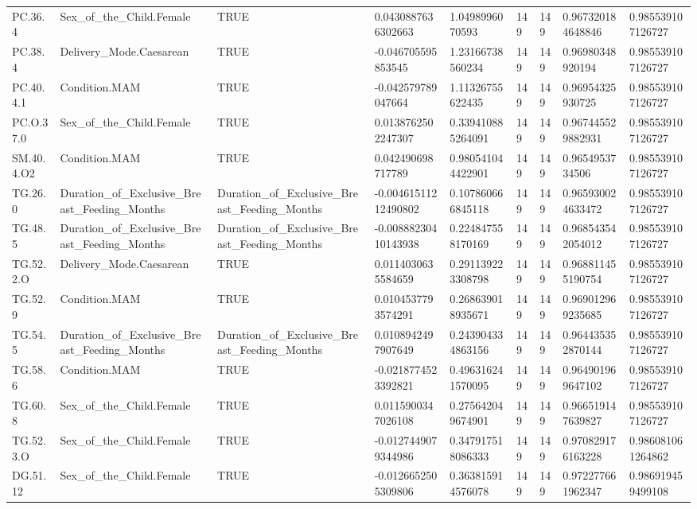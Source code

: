 \begin{longtable}{lllllllll}
PC.36.4 & Sex\_of\_the\_Child.Female & TRUE & 0.0430887636302663 & 1.0498996070593 & 149 & 149 & 0.967320184648846 & 0.985539107126727 \\
PC.38.4 & Delivery\_Mode.Caesarean & TRUE & -0.046705595853545 & 1.23166738560234 & 149 & 149 & 0.96980348920194 & 0.985539107126727 \\
PC.40.4.1 & Condition.MAM & TRUE & -0.042579789047664 & 1.11326755622435 & 149 & 149 & 0.96954325930725 & 0.985539107126727 \\
PC.O.37.0 & Sex\_of\_the\_Child.Female & TRUE & 0.0138762502247307 & 0.339410885264091 & 149 & 149 & 0.967445529882931 & 0.985539107126727 \\
SM.40.4.O2 & Condition.MAM & TRUE & 0.042490698717789 & 0.980541044422901 & 149 & 149 & 0.9654953734506 & 0.985539107126727 \\
TG.26.0 & Duration\_of\_Exclusive\_Breast\_Feeding\_Months & Duration\_of\_Exclusive\_Breast\_Feeding\_Months & -0.00461511212490802 & 0.107860666845118 & 149 & 149 & 0.965930024633472 & 0.985539107126727 \\
TG.48.5 & Duration\_of\_Exclusive\_Breast\_Feeding\_Months & Duration\_of\_Exclusive\_Breast\_Feeding\_Months & -0.00888230410143938 & 0.224847558170169 & 149 & 149 & 0.968543542054012 & 0.985539107126727 \\
TG.52.2.O & Delivery\_Mode.Caesarean & TRUE & 0.0114030635584659 & 0.291139223308798 & 149 & 149 & 0.968811455190754 & 0.985539107126727 \\
TG.52.9 & Condition.MAM & TRUE & 0.0104537793574291 & 0.268639018935671 & 149 & 149 & 0.969012969235685 & 0.985539107126727 \\
TG.54.5 & Duration\_of\_Exclusive\_Breast\_Feeding\_Months & Duration\_of\_Exclusive\_Breast\_Feeding\_Months & 0.0108942497907649 & 0.243904334863156 & 149 & 149 & 0.964435352870144 & 0.985539107126727 \\
TG.58.6 & Condition.MAM & TRUE & -0.0218774523392821 & 0.496316241570095 & 149 & 149 & 0.964901969647102 & 0.985539107126727 \\
TG.60.8 & Sex\_of\_the\_Child.Female & TRUE & 0.0115900347026108 & 0.275642049674901 & 149 & 149 & 0.966519147639827 & 0.985539107126727 \\
TG.52.3.O & Sex\_of\_the\_Child.Female & TRUE & -0.0127449079344986 & 0.347917518086333 & 149 & 149 & 0.970829176163228 & 0.986081061264862 \\
DG.51.12 & Sex\_of\_the\_Child.Female & TRUE & -0.0126652505309806 & 0.363815914576078 & 149 & 149 & 0.972277661962347 & 0.986919459499108 \\

\end{longtable}
